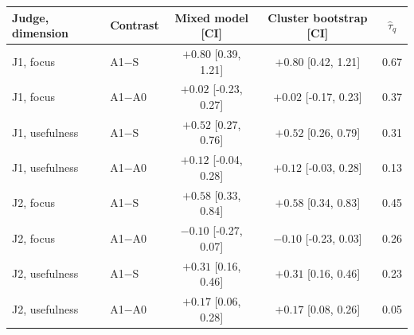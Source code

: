 \begin{tabular}{llccc}
\toprule
Judge, dimension & Contrast & Mixed model [CI] & Cluster bootstrap [CI] & $\hat\tau_{q}$ \\
\midrule
J1, focus & A1$-$S & $+0.80$ [0.39, 1.21] & $+0.80$ [0.42, 1.21] & 0.67 \\
J1, focus & A1$-$A0 & $+0.02$ [-0.23, 0.27] & $+0.02$ [-0.17, 0.23] & 0.37 \\
J1, usefulness & A1$-$S & $+0.52$ [0.27, 0.76] & $+0.52$ [0.26, 0.79] & 0.31 \\
J1, usefulness & A1$-$A0 & $+0.12$ [-0.04, 0.28] & $+0.12$ [-0.03, 0.28] & 0.13 \\
J2, focus & A1$-$S & $+0.58$ [0.33, 0.84] & $+0.58$ [0.34, 0.83] & 0.45 \\
J2, focus & A1$-$A0 & $-0.10$ [-0.27, 0.07] & $-0.10$ [-0.23, 0.03] & 0.26 \\
J2, usefulness & A1$-$S & $+0.31$ [0.16, 0.46] & $+0.31$ [0.16, 0.46] & 0.23 \\
J2, usefulness & A1$-$A0 & $+0.17$ [0.06, 0.28] & $+0.17$ [0.08, 0.26] & 0.05 \\
\bottomrule
\end{tabular}